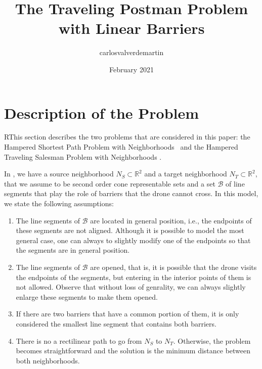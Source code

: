 \documentclass[a4paper]{elsarticle}
\title{The Traveling Postman Problem with Linear Barriers}
\author{carlosvalverdemartin }
\date{February 2021}
\newcommand{\SPPN}{{\sf{H-SPPN}\xspace }}
\newcommand{\TSPN}{{\sf{H-TSPN}\xspace }}
\newcommand{\JP}[1]{{\color{armygreen}#1}}
\begin{document}
\section{Description of the Problem}\label{section:description}
RThis section describes the two problems that are considered in this paper: the Hampered Shortest Path Problem with Neighborhoods \SPPN \ and the Hampered Traveling Salesman Problem with Neighborhoods \TSPN. 

In \SPPN, we have a source neighborhood $N_S\subset\mathbb R^2$ and a target neighborhood $N_T\subset\mathbb R^2$, that we assume to be second order cone representable sets and a set $\mathcal B$ of line segments that play the role of barriers that the drone cannot cross. In this model, we state the following assumptions:

\begin{enumerate}[label=\textbf{A\arabic*},ref=\textbf{A\arabic*}]
\item \label{A1}The line segments of $\mathcal B$ are located in general position, i.e., the endpoints of these segments are not aligned. Although it is possible to model the most general case, \JP{one can always to slightly modify one of the endpoints so that the segments are in general position.}
\item The line segments of $\mathcal B$ are opened, that is, it is possible that the drone visits the endpoints of the segments, but entering  in the interior points of them is not allowed. \JP{Observe that without loss of genrality, we can always slightly enlarge these segments to make them opened.}
\item If there are two barriers that have a common portion of them, it is only considered the smallest line segment that contains both barriers.
\item \label{A4}There is no a rectilinear path to go from $N_S$ to $N_T$. Otherwise, the problem becomes straightforward and the solution is the minimum distance between both neighborhoods.
\end{enumerate}
\end{document}
